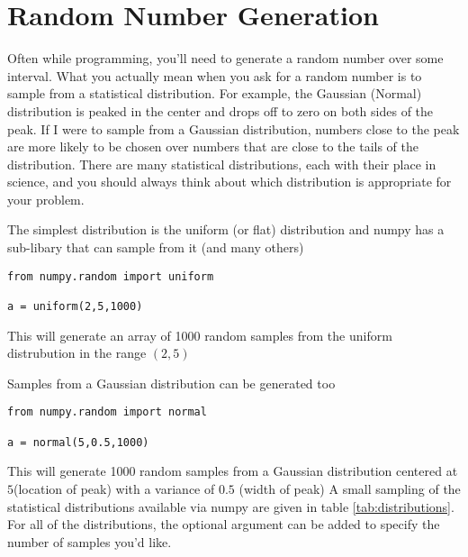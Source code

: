\section{Random Number Generation}
Often while programming, you'll need to generate a random number over
some interval.  What you actually mean when you ask for a random
number is to sample from a statistical distribution.  For example, the
Gaussian (Normal) distribution is peaked in the center and drops off
to zero on both sides of the peak.  If I were to sample from a Gaussian
distribution, numbers close to the peak are more likely to be chosen
over numbers that are close to the tails of the distribution.  There
are many statistical distributions, each with their place in science,
and you should always think about which distribution is appropriate
for your problem.

The simplest distribution is the uniform (or flat) distribution and
numpy has a sub-libary that can sample from it (and many others)

\begin{Verbatim}
from numpy.random import uniform

a = uniform(2,5,1000)
\end{Verbatim}

This will generate an array of 1000 random samples from the uniform
distrubution in the range $(2,5)$

Samples from a Gaussian distribution can be generated too

\begin{Verbatim}
from numpy.random import normal

a = normal(5,0.5,1000)
\end{Verbatim}

This will generate 1000 random samples from a Gaussian distribution
centered at $5$(location of peak) with a variance of $0.5$ (width of peak)
A small sampling of the statistical distributions available via numpy
are given in table \ref{tab:distributions}.  For all of the
distributions, the optional argument  can be added to
specify the number of samples you'd like.

